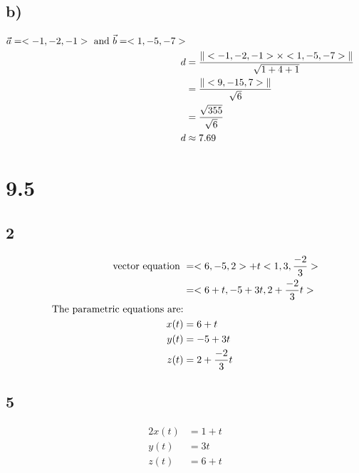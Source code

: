 \documentclass{article}%
\begin{document}
%
\subsection*{b)}%
\begin{alignat*}{2}%
\vec{a} = <-1,-2,-1> \textnormal{ and } \vec{b} = <1, -5, -7>\\%
d &= \frac{\|<-1,-2,-1> \times <1, -5, -7>\|}{\sqrt{1+4+1}}\\%
&= \frac{\|<9,-15,7>\|}{\sqrt{6}}\\%
&= \frac{\sqrt{355}}{\sqrt{6}}\\%
d & \approx 7.69\\%
\end{alignat*}

%
\section*{9.5}%
\subsection*{2}%
\begin{alignat*}{2}%
\textnormal{vector equation } &= <6,-5,2> + t<1,3,\frac{-2}{3}>\\%
&= <6+t, -5+3t, 2+\frac{-2}{3}t>\\%
\textnormal{The parametric equations are:}\\%
x(t) &= 6+t\\%
y(t) &= -5+3t\\%
z(t) &= 2+\frac{-2}{3}t\\%
\end{alignat*}

%
\subsection*{5}%
\begin{alignat*}{2}%
x(t) &= 1+t\\%
y(t) &= 3t\\%
z(t) &= 6+t\\%
\end{alignat*}

%
\end{document}
